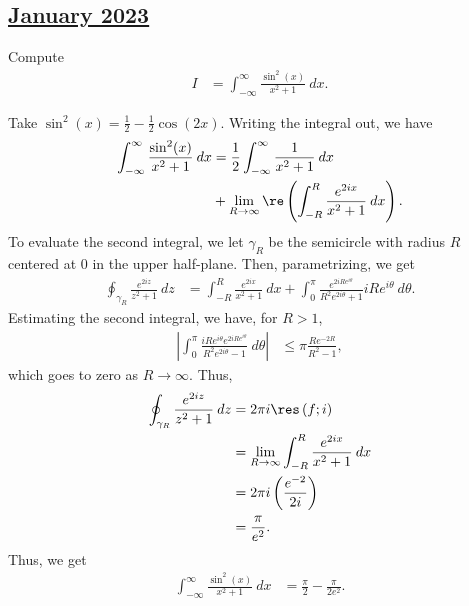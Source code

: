 \documentclass[10pt]{mypackage}
\begin{document}
\subsection{\href{https://math.virginia.edu/graduate/exams/analysis/2023Jan_complex.html}{January 2023}}%
\begin{problem}[Problem 1]
  Compute
  \begin{align*}
    I &= \int_{-\infty}^{\infty} \frac{\sin^2\left( x \right)}{x^2 + 1}\:dx.
  \end{align*}
\end{problem}
\begin{solution}
  Take $\sin^2(x) = \frac{1}{2} - \frac{1}{2}\cos\left( 2x \right)$. Writing the integral out, we have
  \begin{align*}
    \int_{-\infty}^{\infty} \frac{\sin^2(x)}{x^2 + 1}\:dx &= \frac{1}{2} \int_{-\infty}^{\infty} \frac{1}{x^2 + 1}\:dx\\
                                                          &+ \lim_{R\rightarrow\infty} \re\left( \int_{-R}^{R} \frac{e^{2ix}}{x^2 + 1}\:dx \right).
  \end{align*}
  To evaluate the second integral, we let $\gamma_R$ be the semicircle with radius $R$ centered at $0$ in the upper half-plane. Then, parametrizing, we get
  \begin{align*}
    \oint_{\gamma_R}^{} \frac{e^{2iz}}{z^2 + 1}\:dz &= \int_{-R}^{R} \frac{e^{2ix}}{x^2 + 1}\:dx + \int_{0}^{\pi} \frac{e^{2iRe^{i\theta}}}{R^2e^{2i\theta} + 1}iRe^{i\theta}\:d\theta.
  \end{align*}
  Estimating the second integral, we have, for $R > 1$,
  \begin{align*}
    \left\vert \int_{0}^{\pi} \frac{iRe^{i\theta}e^{2iRe^{i\theta}}}{R^2e^{2i\theta} - 1}\:d\theta \right\vert &\leq \pi\frac{Re^{-2R}}{R^2 - 1},
  \end{align*}
  which goes to zero as $R\rightarrow\infty$. Thus,
  \begin{align*}
    \oint_{\gamma_R}^{} \frac{e^{2iz}}{z^2 + 1}\:dz &= 2\pi i \res\left( f;i \right)\\
                                                    &= \lim_{R\rightarrow\infty} \int_{-R}^{R} \frac{e^{2ix}}{x^2 + 1}\:dx\\
                                                    &= 2\pi i \left( \frac{e^{-2}}{2i} \right)\\
                                                    &= \frac{\pi}{e^2}.
  \end{align*}
  Thus, we get
  \begin{align*}
    \int_{-\infty}^{\infty} \frac{\sin^2(x)}{x^2 + 1}\:dx &= \frac{\pi}{2} - \frac{\pi}{2e^2}.
  \end{align*}
\end{solution}
\end{document}
